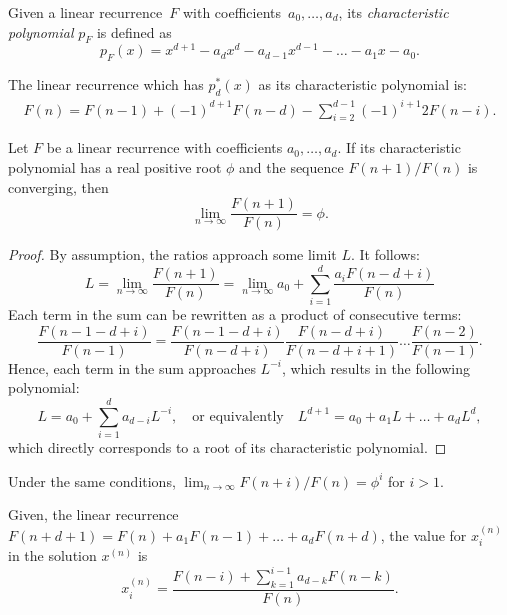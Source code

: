 \begin{definition}
  Given a linear recurrence~$F$ with coefficients~$a_0, \dots, a_d$, its
  \emph{characteristic polynomial} $p_F$ is defined as
  \[
    p_F(x) = x^{d+1} - a_d x^d - a_{d-1} x^{d-1} - \dots - a_1 x - a_0.
  \]
\end{definition}

\begin{example}
  The linear recurrence which has $p_d^*(x)$ as its characteristic polynomial is:
  \begin{align*}
    F(n) = F(n - 1) + (-1)^{d+1} F(n - d) - \sum_{i=2}^{d - 1} (-1)^{i+1} 2 F(n - i).
  \end{align*}
\end{example}

\begin{lemma}
  Let $F$ be a linear recurrence with coefficients $a_0, \dots, a_d$.
  If its characteristic polynomial has a real positive root $\phi$
  and the sequence $F(n+1)/F(n)$ is converging, then
  \[
    \lim_{n \to \infty} \frac{F(n + 1)}{F(n)} = \phi.
  \]
\end{lemma}

\begin{proof}
  By assumption, the ratios approach some limit $L$. It follows:
  \[
    L
    = \lim_{n \to \infty} \frac{F(n + 1)}{F(n)}
    = \lim_{n \to \infty} a_0 + \sum_{i = 1}^d \frac{a_i F(n - d + i)}{F(n)}
  \]
  Each term in the sum can be rewritten as a product of consecutive terms:
  \[
    \frac{F(n - 1 - d + i)}{F(n - 1)}
    = \frac{F(n - 1 - d + i)}{F(n - d + i)} \frac{F(n - d + i)}{F(n - d + i + 1)} \dots \frac{F(n - 2)}{F(n-1)}.
  \]
  Hence, each term in the sum approaches $L^{-i}$,
  which results in the following polynomial:
  \[
    L = a_0 + \sum_{i = 1}^d a_{d - i} L^{-i},
    \quad \text{or equivalently} \quad
    L^{d+1} = a_0 + a_1 L + \dots + a_d L^d,
  \]
  which directly corresponds to a root of its characteristic polynomial.
\end{proof}

\begin{corollary}
  Under the same conditions, $\lim_{n \to \infty} F(n + i) / F(n) = \phi^i$ for $i > 1$.
\end{corollary}

Given, the linear recurrence $F(n + d + 1) = F(n) + a_1 F(n - 1) + \dots + a_d F(n + d)$,
the value for $x_i^{(n)}$ in the solution $x^{(n)}$ is
\begin{equation}
  \label{eq:general-solution}
  x_i^{(n)} = \frac{F(n - i) + \sum_{k=1}^{i-1} a_{d-k} F(n - k)}{F(n)}.
\end{equation}

